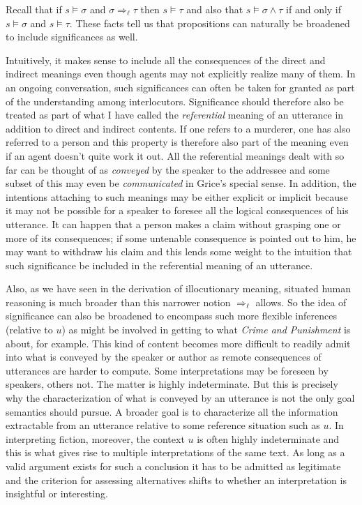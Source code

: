 Recall that if $s \vDash \sigma$ and $\sigma \Rightarrow_\ell \tau$ then $s \vDash \tau$ and also that $s \vDash \sigma \wedge \tau$ if and only if $s \vDash \sigma$ and $s \vDash \tau$. These facts tell us that propositions can naturally be broadened to include significances as well.

Intuitively, it makes sense to include all the consequences of the direct and indirect meanings even though agents may not explicitly realize many of them. In an ongoing conversation, such significances can often be taken for granted as part of the understanding among interlocutors. Significance should therefore also be treated as part of what I have called the \emph{referential} meaning of an utterance in addition to direct and indirect contents. If one refers to a murderer, one has also referred to a person and this property is therefore also part of the meaning even if an agent doesn't quite work it out. All the referential meanings dealt with so far can be thought of as \emph{conveyed} by the speaker to the addressee and some subset of this may even be \emph{communicated} in Grice's special sense. In addition, the intentions attaching to such meanings may be either explicit or implicit because it may not be possible for a speaker to foresee all the logical consequences of his utterance. It can happen that a person makes a claim without grasping one or more of its consequences; if some untenable consequence is pointed out to him, he may want to withdraw his claim and this lends some weight to the intuition that such significance be included in the referential meaning of an utterance.

Also, as we have seen in the derivation of illocutionary meaning, situated human reasoning is much broader than this narrower notion $\Rightarrow_{\ell}$ allows. So the idea of significance can also be broadened to encompass such more flexible inferences (relative to $u$) as might be involved in getting to what \emph{Crime and Punishment} is about, for example. This kind of content becomes more difficult to readily admit into what is conveyed by the speaker or author as remote consequences of utterances are harder to compute. Some interpretations may be foreseen by speakers, others not. The matter is highly indeterminate. But this is precisely why the characterization of what is conveyed by an utterance is not the only goal semantics should pursue. A broader goal is to characterize all the information extractable from an utterance relative to some reference situation such as $u$. In interpreting fiction, moreover, the context $u$ is often highly indeterminate and this is what gives rise to multiple interpretations of the same text. As long as a valid argument exists for such a conclusion it has to be admitted as legitimate and the criterion for assessing alternatives shifts to whether an interpretation is insightful or interesting.

